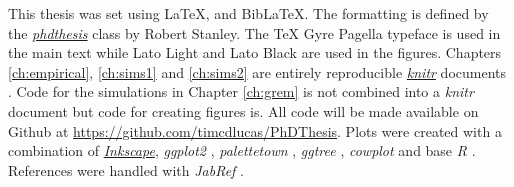 This thesis was set using \LaTeX, \XeLaTeX\vspace{1mm} and Bib\LaTeX. \vspace{-0.12cm} 
The formatting is defined by the \href{https://github.com/robjstan/latex-phdthesis}{\emph{phdthesis}} class by Robert Stanley.
The TeX Gyre Pagella typeface is used in the main text while { Lato Light} and { \color[rgb]{0.75,0.75,0.75} Lato Black} are used in the figures.
Chapters \ref{ch:empirical}, \ref{ch:sims1} and \ref{ch:sims2} are entirely reproducible \href{http://yihui.name/knitr/}{\emph{knitr}} documents \cite{knitr}.
Code for the simulations in Chapter \ref{ch:grem} is not combined into a \emph{knitr} document but code for creating figures is.
All code will be made available on Github at \url{https://github.com/timcdlucas/PhDThesis}. %
Plots were created with a combination of \href{www.inkscape.org}{\emph{Inkscape}}, \emph{ggplot2} \cite{ggplot2}, \emph{palettetown} \cite{palettetown}, \emph{ggtree} \cite{ggtree}, \emph{cowplot} \cite{cowplot} and base \emph{R} \cite{R}.
References were handled with \emph{JabRef} \cite{JabRef_software}. 

